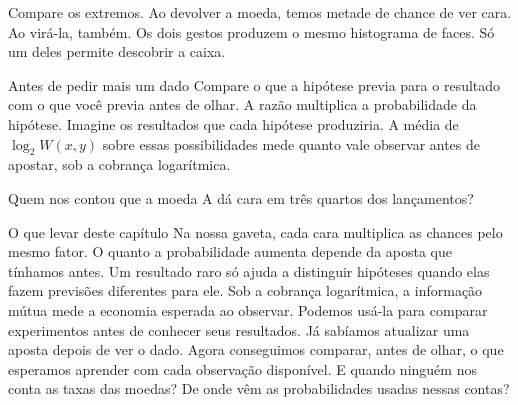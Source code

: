 Compare os extremos. Ao devolver a moeda, temos metade de chance de ver cara. Ao virá-la, também. Os dois gestos produzem o mesmo histograma de faces. Só um deles permite descobrir a caixa.

\begin{quadro}{Antes de pedir mais um dado}
 Compare o que a hipótese previa para o resultado com o que você previa antes de olhar. A razão multiplica a probabilidade da hipótese.
 Imagine os resultados que cada hipótese produziria. A média de $\log_2 W(x,y)$ sobre essas possibilidades mede quanto vale observar antes de apostar, sob a cobrança logarítmica.
\end{quadro}

Quem nos contou que a moeda A dá cara em três quartos dos lançamentos?

\begin{quadro}{O que levar deste capítulo}
 Na nossa gaveta, cada cara multiplica as chances pelo mesmo fator. O quanto a probabilidade aumenta depende da aposta que tínhamos antes.
 Um resultado raro só ajuda a distinguir hipóteses quando elas fazem previsões diferentes para ele.
 Sob a cobrança logarítmica, a informação mútua mede a economia esperada ao observar. Podemos usá-la para comparar experimentos antes de conhecer seus resultados.
 Já sabíamos atualizar uma aposta depois de ver o dado. Agora conseguimos comparar, antes de olhar, o que esperamos aprender com cada observação disponível.
 E quando ninguém nos conta as taxas das moedas? De onde vêm as probabilidades usadas nessas contas?
\end{quadro}
